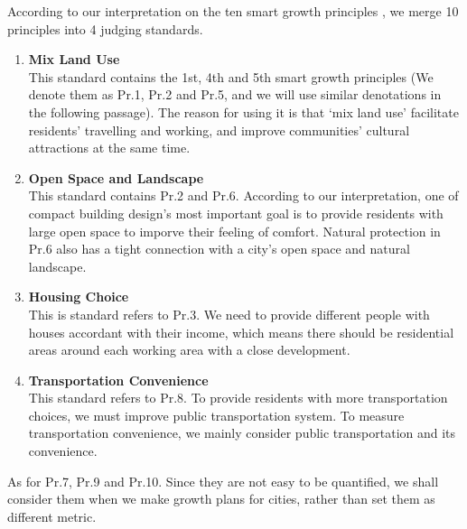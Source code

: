 According to our interpretation on the ten smart growth principles \cite{pdf:smart-growth}, we merge 10 principles into 4 judging standards.
\begin{enumerate}
  \item \textbf{Mix Land Use}\\
  This standard contains the 1st, 4th and 5th smart growth principles (We denote them as Pr.1, Pr.2 and Pr.5, and we will use similar denotations in the following passage). The reason for using it is that `mix land use' facilitate residents' travelling and working, and improve communities' cultural attractions at the same time.
  \item \textbf{Open Space and Landscape}\\
  This standard contains Pr.2 and Pr.6. According to our interpretation, one of compact building design's most important goal is to provide residents with large open space to imporve their feeling of comfort. Natural protection in Pr.6 also has a tight connection with a city's open space and natural landscape.
  \item \textbf{Housing Choice}\\
  This is standard refers to Pr.3. We need to provide different people with houses accordant with their income, which means there should be residential areas around each working area with a close development.
  \item \textbf{Transportation Convenience}\\
  This standard refers to Pr.8. To provide residents with more transportation choices, we must improve public transportation system. To measure transportation convenience, we mainly consider public transportation and its convenience.
\end{enumerate}
As for Pr.7, Pr.9 and Pr.10. Since they are not easy to be quantified, we shall consider them when we make growth plans for cities, rather than set them as different metric.

